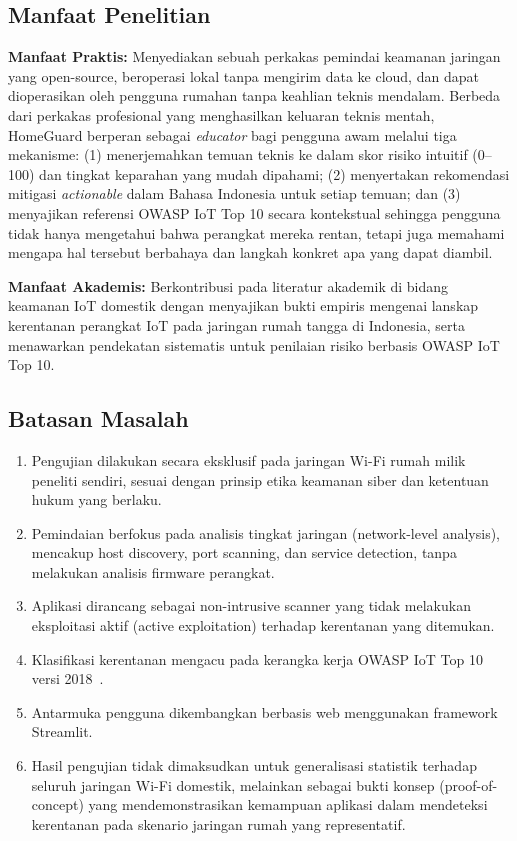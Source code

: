 \subsection{Manfaat Penelitian}
\textbf{Manfaat Praktis:} Menyediakan sebuah perkakas pemindai keamanan
jaringan yang open-source, beroperasi lokal tanpa mengirim data ke cloud, dan
dapat dioperasikan oleh pengguna rumahan tanpa keahlian teknis mendalam.
Berbeda dari perkakas profesional yang menghasilkan keluaran teknis mentah,
HomeGuard berperan sebagai \textit{educator} bagi pengguna awam melalui tiga
mekanisme: (1) menerjemahkan temuan teknis ke dalam skor risiko intuitif
(0--100) dan tingkat keparahan yang mudah dipahami; (2) menyertakan rekomendasi
mitigasi \textit{actionable} dalam Bahasa Indonesia untuk setiap temuan; dan
(3) menyajikan referensi OWASP IoT Top 10 secara kontekstual sehingga pengguna
tidak hanya mengetahui bahwa perangkat mereka rentan, tetapi juga memahami
mengapa hal tersebut berbahaya dan langkah konkret apa yang dapat diambil.

\textbf{Manfaat Akademis:} Berkontribusi pada literatur akademik di bidang
keamanan IoT domestik dengan menyajikan bukti empiris mengenai lanskap
kerentanan perangkat IoT pada jaringan rumah tangga di Indonesia, serta
menawarkan pendekatan sistematis untuk penilaian risiko berbasis OWASP IoT
Top 10.

\subsection{Batasan Masalah}
\begin{enumerate}
    \item Pengujian dilakukan secara eksklusif pada jaringan Wi-Fi rumah milik
    peneliti sendiri, sesuai dengan prinsip etika keamanan siber dan ketentuan
    hukum yang berlaku.
    \item Pemindaian berfokus pada analisis tingkat jaringan (network-level
    analysis), mencakup host discovery, port scanning, dan service detection,
    tanpa melakukan analisis firmware perangkat.
    \item Aplikasi dirancang sebagai non-intrusive scanner yang tidak melakukan
    eksploitasi aktif (active exploitation) terhadap kerentanan yang ditemukan.
    \item Klasifikasi kerentanan mengacu pada kerangka kerja OWASP IoT Top 10
    versi 2018~\cite{b9}.
    \item Antarmuka pengguna dikembangkan berbasis web menggunakan framework
    Streamlit.
    \item Hasil pengujian tidak dimaksudkan untuk generalisasi statistik
    terhadap seluruh jaringan Wi-Fi domestik, melainkan sebagai bukti konsep
    (proof-of-concept) yang mendemonstrasikan kemampuan aplikasi dalam
    mendeteksi kerentanan pada skenario jaringan rumah yang representatif.
\end{enumerate}
